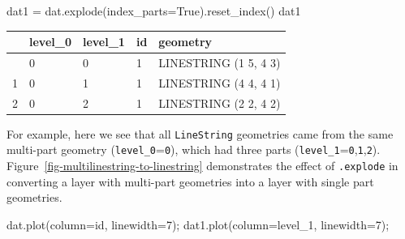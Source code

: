 \documentclass[
  letterpaper,
]{krantz}
\newenvironment{Shaded}{\begin{snugshade}}{\end{snugshade}}
\newcommand{\DecValTok}[1]{\textcolor[rgb]{0.68,0.00,0.00}{#1}}
\newcommand{\NormalTok}[1]{\textcolor[rgb]{0.00,0.23,0.31}{#1}}
\newcommand{\OperatorTok}[1]{\textcolor[rgb]{0.37,0.37,0.37}{#1}}
\newcommand{\StringTok}[1]{\textcolor[rgb]{0.13,0.47,0.30}{#1}}
\newcommand{\VariableTok}[1]{\textcolor[rgb]{0.07,0.07,0.07}{#1}}
\begin{document}
\begin{Shaded}
\begin{Highlighting}[]
\NormalTok{dat1 }\OperatorTok{=}\NormalTok{ dat.explode(index\_parts}\OperatorTok{=}\VariableTok{True}\NormalTok{).reset\_index()}
\NormalTok{dat1}
\end{Highlighting}
\end{Shaded}

\begin{longtable}[]{@{}lllll@{}}
\toprule\noalign{}
& level\_0 & level\_1 & id & geometry \\
\midrule\noalign{}
\endhead
\bottomrule\noalign{}
\endlastfoot
0 & 0 & 0 & 1 & LINESTRING (1 5, 4 3) \\
1 & 0 & 1 & 1 & LINESTRING (4 4, 4 1) \\
2 & 0 & 2 & 1 & LINESTRING (2 2, 4 2) \\
\end{longtable}

For example, here we see that all
\texttt{\textquotesingle{}LineString\textquotesingle{}} geometries came
from the same multi-part geometry (\texttt{level\_0}=\texttt{0}), which
had three parts (\texttt{level\_1}=\texttt{0},\texttt{1},\texttt{2}).
Figure~\ref{fig-multilinestring-to-linestring} demonstrates the effect
of \texttt{.explode} in converting a layer with multi-part geometries
into a layer with single part geometries.

\begin{Shaded}
\begin{Highlighting}[]
\NormalTok{dat.plot(column}\OperatorTok{=}\StringTok{\textquotesingle{}id\textquotesingle{}}\NormalTok{, linewidth}\OperatorTok{=}\DecValTok{7}\NormalTok{)}\OperatorTok{;}
\NormalTok{dat1.plot(column}\OperatorTok{=}\StringTok{\textquotesingle{}level\_1\textquotesingle{}}\NormalTok{, linewidth}\OperatorTok{=}\DecValTok{7}\NormalTok{)}\OperatorTok{;}
\end{Highlighting}
\end{Shaded}
\end{document}
